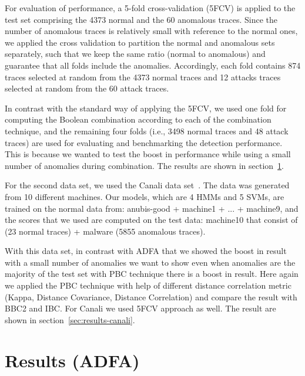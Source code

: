 For evaluation of performance, a 5-fold cross-validation (5FCV) is applied to the test set comprising the 4373 normal and the 60 anomalous traces.
Since the number of anomalous traces is relatively small with reference to the normal ones, we applied the cross validation to partition the normal and anomalous sets separately, such that we keep the same ratio (normal to anomalous) and guarantee that all folds include the anomalies.
Accordingly, each fold contains 874 traces selected at random from the 4373 normal traces and 12 attacks traces selected at random from the 60 attack traces.

In contrast with the standard way of applying the 5FCV, we used one fold for computing the Boolean combination according to each of the combination technique,
and the remaining four folds (i.e., 3498 normal traces and 48 attack traces) are used for evaluating and benchmarking the detection performance.
This is because we wanted to test the boost in performance while using a small number of anomalies during combination. The results are shown in section~\ref{sec:results-ADFA}.

For the second data set, we used the Canali data set~\cite{Canali2012}. The data was generated from 10 different machines. Our models, which are 4 HMMs and 5 SVMs, are trained on the normal data from: anubis-good + machine1 + ... + machine9, and the scores that we used are computed on the test data: machine10 that consist of (23 normal traces) + malware (5855 anomalous traces).

With this data set, in contrast with ADFA that we showed the boost in result with a small number of anomalies we want to show even when  anomalies are the majority of the test set with PBC technique there is a boost in result.
Here again we applied the PBC technique with help of different distance correlation metric (Kappa, Distance Covariance, Distance Correlation) and compare the result with BBC2 and IBC. For Canali we used 5FCV approach as well. The result are shown in section~\ref{sec:results-canali}.



\section{Results (ADFA)}
\label{sec:results-ADFA}



